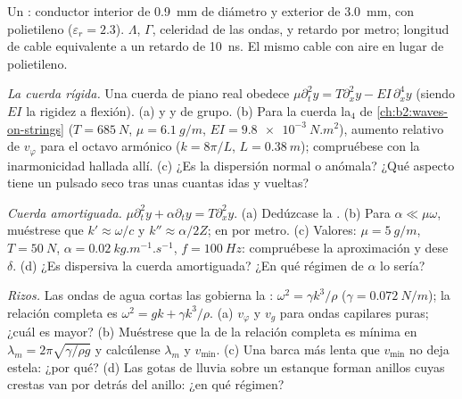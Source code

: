\begin{exercise}[$\star$]\label{exo:b2:dispersion-wave-packets:4}
Un : conductor interior de \qty{0.9}{mm} de diámetro y exterior
de \qty{3.0}{mm}, con polietileno ($\varepsilon_r = 2.3$). $\Lambda$, $\Gamma$, celeridad de las ondas,
 y retardo por metro; longitud de cable
equivalente a un retardo de \qty{10}{ns}. El mismo cable con aire en lugar de polietileno.
\end{exercise}

\begin{exercise}[$\star\star$]\label{exo:b2:dispersion-wave-packets:5}
\emph{La cuerda rígida.} Una cuerda de piano real obedece $\mu\partial_t^2y = T\partial_x^2y
- EI\,\partial_x^4y$ (siendo $EI$ la rigidez a flexión). (a)  y
 y de grupo. (b) Para la cuerda la$_4$ de
\cref{ch:b2:waves-on-strings} ($T = \qty{685}{N}$, $\mu = \qty{6.1}{g/m}$, $EI =
\qty{9.8e-3}{N.m^2}$), aumento relativo de $v_\varphi$ para el octavo
armónico ($k = 8\pi/L$, $L = \qty{0.38}{m}$); compruébese con la
inarmonicidad hallada allí. (c) ¿Es la dispersión normal o anómala? ¿Qué
aspecto tiene un pulsado seco tras unas cuantas idas y vueltas?
\end{exercise}

\begin{exercise}[$\star\star$]\label{exo:b2:dispersion-wave-packets:6}
\emph{Cuerda amortiguada.} $\mu\partial_t^2y + \alpha\partial_ty = T\partial_x^2y$. (a) Dedúzcase
la . (b) Para $\alpha \ll \mu\omega$, muéstrese que $k' \approx \omega/c$ y
$k'' \approx \alpha/2Z$;  en  por metro. (c) Valores: $\mu =
\qty{5}{g/m}$, $T = \qty{50}{N}$, $\alpha = \qty{0.02}{kg.m^{-1}.s^{-1}}$, $f =
\qty{100}{Hz}$: compruébese la aproximación y dese $\delta$. (d) ¿Es dispersiva
la cuerda amortiguada? ¿En qué régimen de $\alpha$ lo sería?
\end{exercise}

\begin{exercise}[$\star\star$]\label{exo:b2:dispersion-wave-packets:7}
\emph{Rizos.} Las ondas de agua cortas las gobierna la : $\omega^2 =
\gamma k^3/\rho$ ($\gamma = \qty{0.072}{N/m}$); la relación completa es $\omega^2 = gk +
\gamma k^3/\rho$. (a) $v_\varphi$ y $v_g$ para ondas capilares puras; ¿cuál es
mayor? (b) Muéstrese que la  de la relación completa es
mínima en $\lambda_m = 2\pi\sqrt{\gamma/\rho g}$ y calcúlense $\lambda_m$ y $v_{\min}$.
(c) Una barca más lenta que $v_{\min}$ no deja estela: ¿por qué? (d) Las
gotas de lluvia sobre un estanque forman anillos cuyas crestas van por detrás del anillo: ¿en qué régimen?
\end{exercise}

